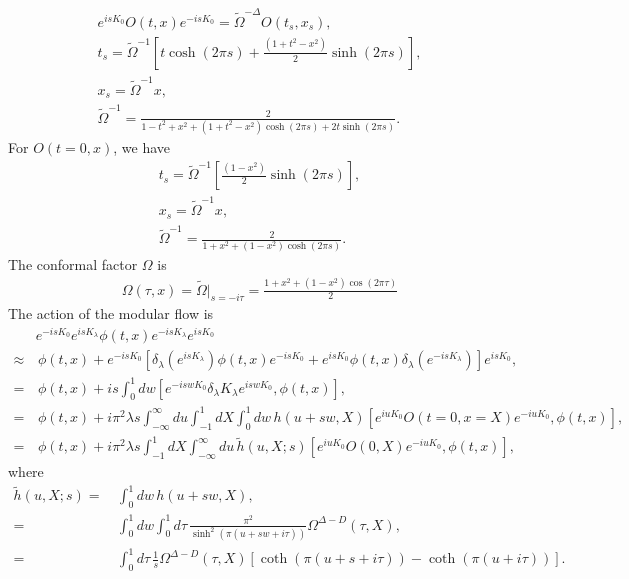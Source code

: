 \documentclass[a4paper,11pt]{article}
\theoremstyle{definition}
\begin{document}
\begin{gather}
    e^{isK_0} O(t,x) e^{-isK_0} = \tilde{\Omega}^{-\Delta} O(t_s,x_s), \\
    t_s = \tilde{\Omega}^{-1}\left[t \cosh(2\pi s) + \frac{(1+t^2-x^2)}{2}\sinh(2\pi s) \right],\\
    x_s = \tilde{\Omega}^{-1}x, \\
    \tilde{\Omega}^{-1} = \frac{2}{1-t^2+x^2+(1+t^2-x^2)\cosh(2\pi s) + 2t \sinh(2\pi s)}.
\end{gather}
For $O(t=0,x)$, we have
\begin{gather}
    t_s = \tilde{\Omega}^{-1}\left[\frac{(1-x^2)}{2}\sinh(2\pi s) \right],\\
    x_s = \tilde{\Omega}^{-1}x, \\
    \tilde{\Omega}^{-1} = \frac{2}{1+x^2+(1-x^2)\cosh(2\pi s)}.
\end{gather}
The conformal factor $\Omega$ is
\begin{align}
    \Omega(\tau,x) = \tilde{\Omega}|_{s=-i\tau} = \frac{1+x^2+(1-x^2)\cos(2\pi \tau)}{2}
\end{align}
The action of the modular flow is
\begin{align}
    &e^{-isK_0}e^{isK_\lambda} \phi(t,x) e^{-isK_\lambda}e^{isK_0} \nonumber\\
    \approx& \, \phi(t,x) + e^{-isK_0}\left[\delta_\lambda(e^{isK_\lambda}) \phi(t,x)e^{-isK_0} + e^{isK_0}\phi(t,x) \delta_\lambda(e^{-isK_\lambda}) \right]e^{isK_0},\\
    =& \, \phi(t,x) + is\int_0^1 dw \left[e^{-iswK_0} \delta_\lambda K_\lambda e^{iswK_0} ,\phi(t,x)\right], \\
    =& \, \phi(t,x) + i\pi^2 \lambda s \int_{-\infty}^{\infty} du \int_{-1}^1 dX \int_0^1 dw\, h(u+sw,X)\left[  e^{iuK_0} O(t=0,x=X) e^{-iuK_0} ,\phi(t,x)\right],\\
    =& \, \phi(t,x) + i\pi^2 \lambda s \int_{-1}^1 dX \int_{-\infty}^{\infty} du \, \tilde{h}(u,X;s)\left[  e^{iuK_0} O(0,X) e^{-iuK_0} ,\phi(t,x)\right],
\end{align}
where
\begin{align}
    \tilde{h}(u,X;s)=& \, \int_0^1 dw\, h(u+sw,X),\\
    =& \, \int_0^1 dw\int_0^1 d\tau \, \frac{\pi^2}{\sinh^2(\pi (u+sw+i\tau))} \Omega^{\Delta - D}(\tau,X), \\
    =& \, \int_0^1 d\tau \, \frac{1}{s}\Omega^{\Delta - D}(\tau,X) \left[ \coth(\pi (u+s+i\tau)) - \coth(\pi (u+i\tau))\right].
\end{align}
\end{document}
